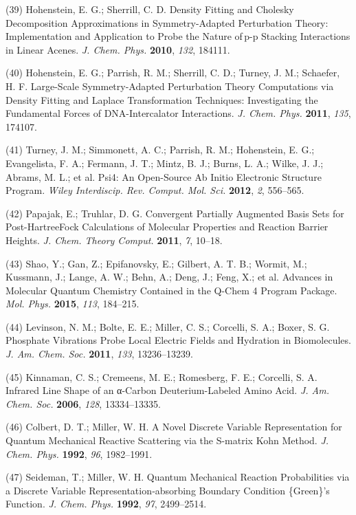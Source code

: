 (39) Hohenstein, E. G.; Sherrill, C. D. Density Fitting and Cholesky Decomposition Approximations in Symmetry-Adapted Perturbation Theory: Implementation and Application to Probe the Nature of\,p-p Stacking Interactions in Linear Acenes. \emph{J. Chem. Phys.} \textbf{2010}, \emph{132}, 184111.

(40) Hohenstein, E. G.; Parrish, R. M.; Sherrill, C. D.; Turney, J. M.; Schaefer, H. F. Large-Scale Symmetry-Adapted Perturbation Theory Computations via Density Fitting and Laplace Transformation Techniques: Investigating the Fundamental Forces of DNA-Intercalator Interactions.  \emph{J. Chem. Phys.} \textbf{2011}, \emph{135}, 174107.

(41) Turney, J. M.; Simmonett, A. C.; Parrish, R. M.; Hohenstein, E. G.; Evangelista, F. A.; Fermann, J. T.; Mintz, B. J.; Burns, L. A.; Wilke, J. J.; Abrams, M. L.; et al. Psi4: An Open-Source Ab Initio Electronic Structure Program. \emph{Wiley Interdiscip. Rev. Comput. Mol. Sci.}  \textbf{2012}, \emph{2}, 556--565.

(42) Papajak, E.; Truhlar, D. G. Convergent Partially Augmented Basis Sets for Post-Hartree\textendash{}Fock Calculations of Molecular Properties and Reaction Barrier Heights. \emph{J. Chem. Theory Comput.} \textbf{2011}, \emph{7}, 10--18.

(43) Shao, Y.; Gan, Z.; Epifanovsky, E.; Gilbert, A. T. B.; Wormit, M.; Kussmann, J.; Lange, A. W.; Behn, A.; Deng, J.; Feng, X.; et al.  Advances in Molecular Quantum Chemistry Contained in the Q-Chem 4 Program Package. \emph{Mol. Phys.} \textbf{2015}, \emph{113}, 184--215.

(44) Levinson, N. M.; Bolte, E. E.; Miller, C. S.; Corcelli, S. A.; Boxer, S. G. Phosphate Vibrations Probe Local Electric Fields and Hydration in Biomolecules. \emph{J. Am. Chem. Soc.} \textbf{2011}, \emph{133}, 13236--13239.

(45) Kinnaman, C. S.; Cremeens, M. E.; Romesberg, F. E.; Corcelli, S. A.  Infrared Line Shape of an α-Carbon Deuterium-Labeled Amino Acid.  \emph{J. Am. Chem. Soc.} \textbf{2006}, \emph{128}, 13334--13335.

(46) Colbert, D. T.; Miller, W. H. A Novel Discrete Variable Representation for Quantum Mechanical Reactive Scattering via the S-matrix Kohn Method. \emph{J. Chem. Phys.} \textbf{1992}, \emph{96}, 1982--1991.

(47) Seideman, T.; Miller, W. H. Quantum Mechanical Reaction Probabilities via a Discrete Variable Representation‐absorbing Boundary Condition \{Green\}'s Function. \emph{J. Chem. Phys.} \textbf{1992}, \emph{97}, 2499--2514.

